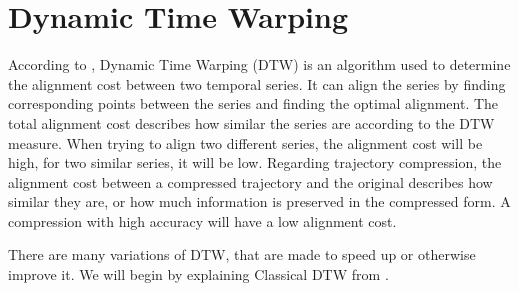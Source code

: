 \section{Dynamic Time Warping}
\label{sec:dtw}
According to \textcite{muller2007dynamic}, Dynamic Time Warping (DTW) is an algorithm used to determine the alignment cost between two temporal series. It can align the series by finding corresponding points between the series and finding the optimal alignment. The total alignment cost describes how similar the series are according to the DTW measure. When trying to align two different series, the alignment cost will be high, for two similar series, it will be low. Regarding trajectory compression, the alignment cost between a compressed trajectory and the original describes how similar they are, or how much information is preserved in the compressed form. A compression with high accuracy will have a low alignment cost.

There are many variations of DTW, that are made to speed up or otherwise improve it. We will begin by explaining Classical DTW from \textcite{muller2007dynamic}.

